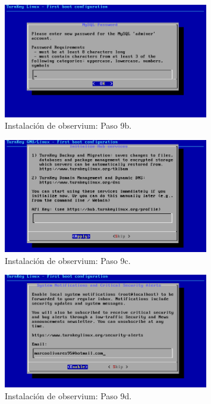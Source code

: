 \begin{figure}[htbp!]
	\centering
		\includegraphics[width=0.8\textwidth]{images/desarrollo/instalarObservium_paso9b.png}
	\caption{Instalación de observium: Paso 9b.}
\end{figure}

\begin{figure}[htbp!]
	\centering
		\includegraphics[width=0.8\textwidth]{images/desarrollo/instalarObservium_paso9c.png}
	\caption{Instalación de observium: Paso 9c.}
\end{figure}

\begin{figure}[htbp!]
	\centering
		\includegraphics[width=0.8\textwidth]{images/desarrollo/instalarObservium_paso9d.png}
	\caption{Instalación de observium: Paso 9d.}
\end{figure}

